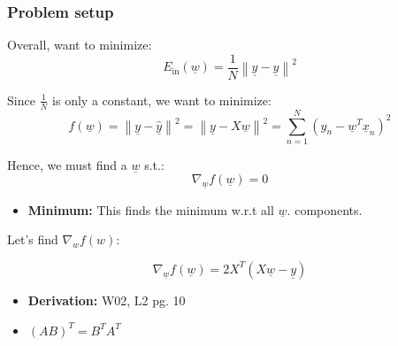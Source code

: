     \subsubsection{Problem setup}
    \begin{definition}
        Overall, want to minimize:
        \[
        E_{\text{in}}(\underline{w}) = \frac{1}{N} \left\| \underline{y} - \underline{\hat{y}} \right\|^2 
        \]

        Since $\frac{1}{N}$ is only a constant, we want to minimize:
        \[
        f(\underline{w}) = \left\| \underline{y} - \underline{\hat{y}} \right\|^2 = \left\| \underline{y} - X \underline{w} \right\|^2 = \sum_{n=1}^{N} \left( y_n - \underline{w}^T \underline{x}_n \right)^2
        \]

        Hence, we must find a \(\underline{w}\) s.t.:
        \[
        \nabla_{\underline{w}} f(\underline{w}) = 0
        \]
        \begin{itemize}
            \item \textbf{Minimum:} This finds the minimum w.r.t all $\underline{w}$. components.
        \end{itemize}
        \vspace{1em}

        Let's find \( \nabla_w f(w) \):

        \begin{equation}
            \nabla_{\underline{w}} f(\underline{w}) = 2 X^T (X \underline{w} - \underline{y})    
        \end{equation}
        \begin{itemize}
            \item \textbf{Derivation:} W02, L2 pg. 10
            \item $(AB)^T = B^T A^T$
        \end{itemize}
    \end{definition}

